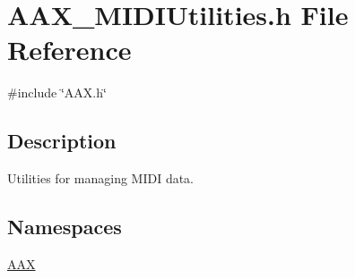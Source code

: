 \hypertarget{a00647}{}\section{A\+A\+X\+\_\+\+M\+I\+D\+I\+Utilities.\+h File Reference}
\label{a00647}
{\ttfamily \#include \char`\"{}A\+A\+X.\+h\char`\"{}}\newline


\subsection{Description}
Utilities for managing M\+I\+DI data. 

\subsection*{Namespaces}
\begin{DoxyCompactItemize}
\item 
 \mbox{\hyperlink{a00852}{A\+AX}}
\end{DoxyCompactItemize}
